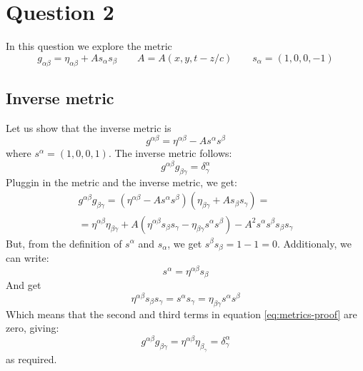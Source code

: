 \documentclass{article}
\begin{document}
\newpage
\section{Question 2}
In this question we explore the metric
\begin{equation}
\label{eq:metric}
    g_{\alpha\beta} = \eta_{\alpha\beta} + A s_{\alpha} s_{\beta}
    \qquad
    A = A(x, y, t - z/c)
    \qquad
    s_\alpha = (1, 0, 0, -1)
\end{equation}

\subsection{Inverse metric}
Let us show that the inverse metric is
\begin{equation}
\label{eq:inverse-metric}
    g^{\alpha\beta} = \eta^{\alpha\beta} - A s^\alpha s^\beta
\end{equation}
where $s^\alpha = (1, 0, 0, 1)$. The inverse metric follows:
\begin{equation}
    g^{\alpha\beta}g_{\beta\gamma} = \delta^\alpha_\gamma
\end{equation}
Pluggin in the metric and the inverse metric, we get:
\begin{equation}
\label{eq:metrics-proof}
\begin{gathered}
    g^{\alpha\beta}g_{\beta\gamma} =
    \left(\eta^{\alpha\beta} - A s^\alpha s^\beta\right)
    \left(\eta_{\beta\gamma} + A s_{\beta} s_{\gamma}\right) = \\ = 
    \eta^{\alpha\beta}\eta_{\beta\gamma}
    + A\left(\eta^{\alpha\beta} s_\beta s_\gamma - \eta_{\beta\gamma}s^{\alpha}s^{\beta}\right)
    - A^2 s^\alpha s^\beta s_\beta s_\gamma
\end{gathered}
\end{equation}
But, from the definition of $s^\alpha$ and $s_\alpha$, we get $s^\beta s_\beta = 1 - 1 = 0$. Additionaly, we can write:
\begin{equation}
    s^{\alpha} = \eta^{\alpha\beta}s_\beta
\end{equation}
And get
\begin{equation}
    \eta^{\alpha\beta}s_\beta s_\gamma = s^\alpha s_\gamma = \eta_{\beta\gamma} s^{\alpha} s^{\beta}
\end{equation}
Which means that the second and third terms in equation \ref{eq:metrics-proof} are zero, giving:
\begin{equation}
    g^{\alpha\beta} g_{\beta\gamma} = \eta^{\alpha\beta}\eta_{\beta_\gamma} = \delta^{\alpha}_{\gamma}
\end{equation}
as required.
\end{document}
